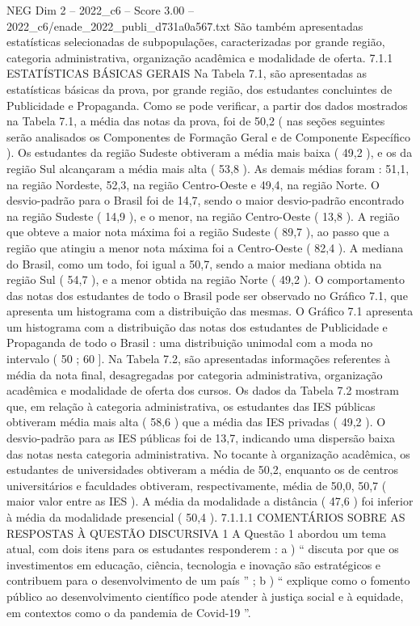 \begin{textsample}{NEG Dim 2 – 2022\_c6 – Score 3.00 – 2022\_c6/enade\_2022\_publi\_d731a0a567.txt}
São também apresentadas estatísticas selecionadas de subpopulações, caracterizadas por grande região, categoria administrativa, organização acadêmica e modalidade de oferta. 7.1.1 ESTATÍSTICAS BÁSICAS GERAIS Na Tabela 7.1, são apresentadas as estatísticas básicas da prova, por grande região, dos estudantes concluintes de Publicidade e Propaganda.
Como se pode verificar, a partir dos dados mostrados na Tabela 7.1, a média das notas da prova, foi de 50,2 ( nas seções seguintes serão analisados os Componentes de Formação Geral e de Componente Específico ).
Os estudantes da região Sudeste obtiveram a média mais baixa ( 49,2 ), e os da região Sul alcançaram a média mais alta ( 53,8 ).
As demais médias foram : 51,1, na região Nordeste, 52,3, na região Centro-Oeste e 49,4, na região Norte.
O desvio-padrão para o Brasil foi de 14,7, sendo o maior desvio-padrão encontrado na região Sudeste ( 14,9 ), e o menor, na região Centro-Oeste ( 13,8 ).
A região que obteve a maior nota máxima foi a região Sudeste ( 89,7 ), ao passo que a região que atingiu a menor nota máxima foi a Centro-Oeste ( 82,4 ).
A mediana do Brasil, como um todo, foi igual a 50,7, sendo a maior mediana obtida na região Sul ( 54,7 ), e a menor obtida na região Norte ( 49,2 ).
O comportamento das notas dos estudantes de todo o Brasil pode ser observado no Gráfico 7.1, que apresenta um histograma com a distribuição das mesmas.
O Gráfico 7.1 apresenta um histograma com a distribuição das notas dos estudantes de Publicidade e Propaganda de todo o Brasil : uma distribuição unimodal com a moda no intervalo ( 50 ; 60 ].
Na Tabela 7.2, são apresentadas informações referentes à média da nota final, desagregadas por categoria administrativa, organização acadêmica e modalidade de oferta dos cursos.
Os dados da Tabela 7.2 mostram que, em relação à categoria administrativa, os estudantes das IES públicas obtiveram média mais alta ( 58,6 ) que a média das IES privadas ( 49,2 ).
O desvio-padrão para as IES públicas foi de 13,7, indicando uma dispersão baixa das notas nesta categoria administrativa.
No tocante à organização acadêmica, os estudantes de universidades obtiveram a média de 50,2, enquanto os de centros universitários e faculdades obtiveram, respectivamente, média de 50,0, 50,7 ( maior valor entre as IES ).
A média da modalidade a distância ( 47,6 ) foi inferior à média da modalidade presencial ( 50,4 ). 7.1.1.1 COMENTÁRIOS SOBRE AS RESPOSTAS À QUESTÃO DISCURSIVA 1 A Questão 1 abordou um tema atual, com dois itens para os estudantes responderem : a ) “ discuta por que os investimentos em educação, ciência, tecnologia e inovação são estratégicos e contribuem para o desenvolvimento de um país ” ; b ) “ explique como o fomento público ao desenvolvimento científico pode atender à justiça social e à equidade, em contextos como o da pandemia de Covid-19 ”.

\end{textsample}
